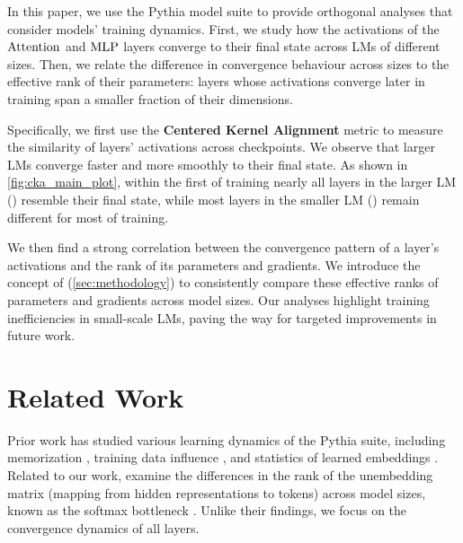 In this paper, we use the Pythia model suite \citep{biderman2023pythia} to provide orthogonal analyses that consider models' training dynamics.  
First, we study how the activations of the $\mathrm{Attention}$ and $\mathrm{MLP}$ layers converge to their final state across LMs of different sizes. Then, we relate the difference in convergence behaviour across sizes to the effective rank of their parameters: layers whose activations converge later in training span a smaller fraction of their dimensions.

Specifically, we first use the \textbf{Centered Kernel Alignment} \citep[$\cka$;][]{kornblith2019cka} metric to measure the similarity of layers' activations across checkpoints. We observe that larger LMs converge faster and more smoothly to their final state. As shown in \cref{fig:cka_main_plot}, within the first  of training nearly all layers in the larger LM (\twobil) resemble their final state, while most layers in the smaller LM (\sixmil) remain different for most of training.

We then find a strong correlation between the convergence pattern of a layer's activations and the rank of its parameters and gradients. We introduce the concept of  (\cref{sec:methodology}) to consistently compare these effective ranks of parameters and gradients 
across model sizes. Our analyses highlight training inefficiencies in small-scale LMs, paving the way for targeted improvements in future work.


\section{Related Work}\label{sec:related_work}

Prior work has studied various learning dynamics of the Pythia suite, including memorization \citep{biderman2023pythia, lesci2024causal}, training data influence \citep{chai2024training}, and statistics of learned embeddings \citep{belrose2024neural}.
Related to our work, \citet{godey2024small} examine the differences in the rank of the unembedding matrix (mapping from hidden representations to tokens) across model sizes, known as the softmax bottleneck \citep{yang2018breaking}. Unlike their findings, we focus on the convergence dynamics of all layers.

